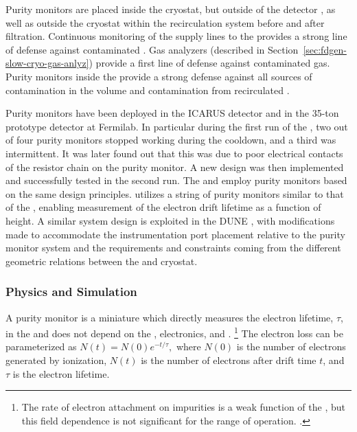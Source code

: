 Purity monitors are placed inside the cryostat, but outside of the detector , as well as outside the cryostat within the recirculation system before and after filtration. %
Continuous monitoring of  the  supply lines to the  provides a strong line of defense against contaminated \lar. Gas analyzers (described in Section~\ref{sec:fdgen-slow-cryo-gas-anlyz}) provide a first line of defense against contaminated gas.  Purity monitors inside the  provide a strong defense against all sources of contamination in the \lar volume and contamination from recirculated \lar.

Purity monitors have been deployed in the ICARUS detector and in the 35-ton prototype detector at Fermilab. In particular during the first run of the , two out of four purity monitors stopped working during the cooldown, and a third was intermittent. It was later found out that this was due to poor electrical contacts of the resistor chain on the purity monitor. A new design was then implemented and successfully tested in the second run. 
The  and  employ purity monitors based on the same design principles.  utilizes a string of purity monitors similar to that of the , enabling measurement of the electron drift lifetime as a function of height.  A similar system design is exploited in the DUNE , with modifications made to accommodate the instrumentation port placement relative to the purity monitor system and the requirements and constraints coming from the different geometric relations between the  and cryostat. 

\subsubsection{Physics and Simulation}

A purity monitor is a miniature  which directly measures the electron lifetime, $\tau$, in the  and does not depend on the   , electronics, and .%
\footnote{The rate of electron attachment on impurities is a weak function of
the \efield, but this field dependence is not significant for the range of \lartpc operation.%
\cite{docdb-4482}.}%
The electron loss can be parameterized as
%
\(N(t) = N(0)e^{-t/\tau},\)
%
where $N(0)$ is the number of electrons generated by ionization, $N(t)$ is the number of electrons after drift time $t$, and $\tau$ is the electron lifetime. 

